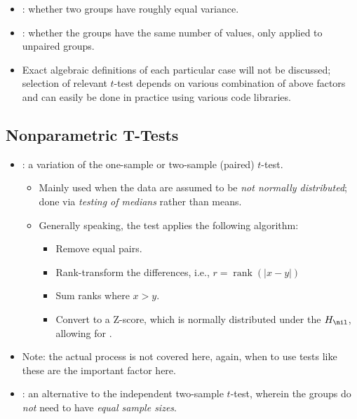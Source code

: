 \begin{itemize}
\begin{itemize}
\begin{itemize}
      \item {}: whether two groups have roughly equal variance.
      \item {}: whether the groups have the same number of values, only applied to unpaired groups.
      \item Exact algebraic definitions of each particular case will not be discussed; selection of relevant \(t\)-test depends on various combination of above factors and can easily be done in practice using various code libraries.
    \end{itemize}
  \end{itemize}

  \subsection{Nonparametric T-Tests}
  \begin{itemize}
    \item {}: a \hyperref[Subsection: Parametric vs. Nonparametric]{} variation of the one-sample or two-sample (paired) \(t\)-test.
      \begin{itemize}
        \item Mainly used when the data are assumed to be \emph{not normally distributed}; done via \emph{testing of medians} rather than means.
        \item Generally speaking, the test applies the following algorithm:
          \begin{itemize}
            \item Remove equal pairs.
            \item Rank-transform the differences, i.e., \(r= \operatorname{rank}(|x-y|)\)
            \item Sum ranks where \(x>y\).
            \item Convert to a Z-score, which is normally distributed under the \(H_\nil\), allowing for \hyperref[Subsection: Degrees of Freedom]{}.
          \end{itemize}
      \end{itemize}
      \item Note: the actual process is not covered here, again, when to use tests like these are the important factor here.
      \item {}: an alternative to the independent two-sample \(t\)-test, wherein the groups do \emph{not} need to have \emph{equal sample sizes}.

\end{itemize}
\end{itemize}
